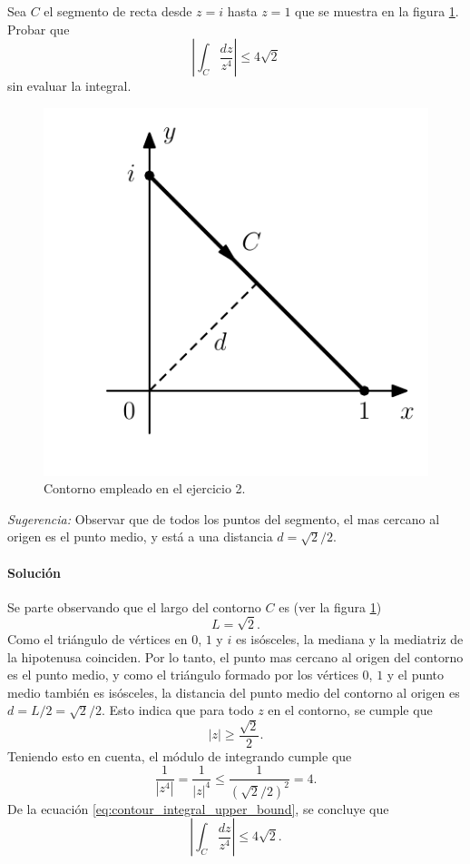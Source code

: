 \documentclass[a4paper]{report}
\begin{document}
Sea \(C\) el segmento de recta desde \(z=i\) hasta \(z=1\) que se muestra en la figura \ref{fig:exercise_47_02}. Probar que 
\[
 \left|\int_C\frac{dz}{z^4}\right|\leq4\sqrt{2}
\]
sin evaluar la integral.
\begin{figure}[!htb]
 \begin{minipage}[c]{0.35\textwidth}
   \includegraphics[width=\textwidth]{figuras/exercise_47_02.pdf}
 \end{minipage}\hfill
 \begin{minipage}[c]{0.55\textwidth}
  \caption{
       Contorno empleado en el ejercicio 2.
  }\label{fig:exercise_47_02}
 \end{minipage}
\end{figure}

\emph{Sugerencia:} Observar que de todos los puntos del segmento, el mas cercano al origen es el punto medio, y está a una distancia \(d=\sqrt{2}/2\).

\paragraph{Solución} Se parte observando que el largo del contorno \(C\) es (ver la figura \ref{fig:exercise_47_02})
\[
 L=\sqrt{2}.
\]
Como el triángulo de vértices en \(0\), \(1\) y \(i\) es isósceles, la mediana y la mediatriz de la hipotenusa coinciden. Por lo tanto, el punto mas cercano al origen del contorno es el punto medio, y como el triángulo formado por los vértices \(0\), \(1\) y el punto medio también es isósceles, la distancia del punto medio del contorno al origen es \(d=L/2=\sqrt{2}/2\). Esto indica que para todo \(z\) en el contorno, se cumple que 
\[
 |z|\geq\frac{\sqrt{2}}{2}.
\]
Teniendo esto en cuenta, el módulo de integrando cumple que 
\[
 \frac{1}{|z^4|}=\frac{1}{|z|^4}\leq\frac{1}{(\sqrt{2}/2)^2}=4.
\]
De la ecuación \ref{eq:contour_integral_upper_bound}, se concluye que 
\[
 \left|\int_C\frac{dz}{z^4}\right|\leq4\sqrt{2}.
\]
\end{document}
